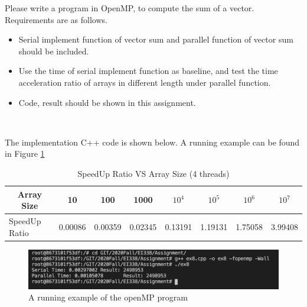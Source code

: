 \begin{exercise}[]{
    \item Please write a program in OpenMP, to compute the sum of a vector. Requirements are as follows.
    \begin{itemize}
        \item Serial implement function of vector sum and parallel function of vector sum should be included.
        \item Use the time of serial implement function as baseline, and test the time acceleration ratio of arrays in different length under parallel function. 
        \item Code, result should be shown in this assignment.
    \end{itemize}}
  \begin{solution}
  \par{~}

  The implementation C++ code is shown below. A running example can be found in Figure \ref{fig:ex3}

  \begin{table}[p]
    \begin{center}
      \begin{tabular}{llllllll}
      \hline
      \multicolumn{1}{c}{\textbf{Array Size}} & \multicolumn{1}{c}{10} & \multicolumn{1}{c}{100} & \multicolumn{1}{c}{1000} & \multicolumn{1}{c}{\textbf{$10^4$}} & \multicolumn{1}{c}{\textbf{$10^5$}} & \multicolumn{1}{c}{\textbf{$10^6$}} & \multicolumn{1}{c}{\textbf{$10^7$}} \\ \hline
SpeedUp Ratio                           & 0.00086                         & 0.00359                          & 0.02345                           & 0.13191                             & 1.19131                             & 1.75058                             & 3.99408                             \\ \hline

      \end{tabular}
    \end{center}
    \caption{SpeedUp Ratio VS Array Size (4 threads)}
  \end{table}

  \begin{figure}[p]
    \begin{center}
        \includegraphics[width=0.5\linewidth]{ex8.png}
        \caption{A running example of the openMP program}
        \label{fig:ex3}
    \end{center}
  \end{figure}



  \end{solution}
  \label{ex3}
\end{exercise}



